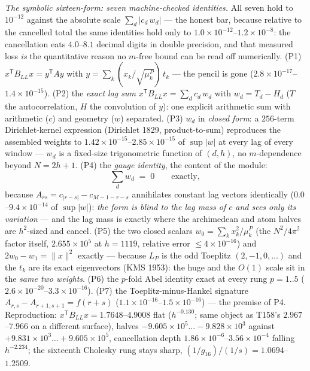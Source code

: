\documentclass[11pt,a4paper]{article}
\begin{document}
\emph{The symbolic sixteen-form: seven machine-checked identities.} All seven hold
to $10^{-12}$ against the absolute scale $\sum_d|c_d\,w_d|$ --- the honest bar,
because relative to the cancelled total the same identities hold only to
$1.0\times10^{-12}$--$1.2\times10^{-8}$: the cancellation eats $4.0$--$8.1$ decimal
digits in double precision, and that measured loss \emph{is} the quantitative
reason no $m$-free bound can be read off numerically. (P1) $x^{\mathsf
T}B_{LL}x=y^{\mathsf T}Ay$ with $y=\sum_k(x_k/\sqrt{\mu^P_k})\,t_k$ --- the pencil
is gone ($2.8\times10^{-17}$--$1.4\times10^{-15}$). (P2) the \emph{exact lag sum}
$x^{\mathsf T}B_{LL}x=\sum_d c_d\,w_d$ with $w_d=T_d-H_d$ ($T$ the autocorrelation,
$H$ the convolution of $y$): one explicit arithmetic sum with arithmetic ($c$) and
geometry ($w$) separated. (P3) $w_d$ in \emph{closed form}: a $256$-term
Dirichlet-kernel expression (Dirichlet 1829, product-to-sum) reproduces the
assembled weights to $1.42\times10^{-15}$--$2.85\times10^{-15}$ of $\sup|w|$ at
every lag of every window --- $w_d$ is a fixed-size trigonometric function of
$(d,h)$, no $m$-dependence beyond $N=2h+1$. (P4) the \emph{gauge identity},
the content of the module:
\[
\sum_d w_d \;=\; 0 \qquad\text{exactly},
\]
because $A_{rs}=c_{|r-s|}-c_{M-1-r-s}$ annihilates constant lag vectors
identically ($0.0$--$9.4\times10^{-14}$ of $\sup|w|$): \emph{the form is blind to
the lag mass of $c$ and sees only its variation} --- and the lag mass is exactly
where the archimedean and atom halves are $h^2$-sized and cancel. (P5) the two
closed scalars $w_0=\sum_k x_k^2/\mu^P_k$ (the $N^2/4\pi^2$ factor itself,
$2.655\times10^{5}$ at $h=1119$, relative error $\le4\times10^{-16}$) and
$2w_0-w_1=\|x\|^2$ exactly --- because $L_P$ is the odd Toeplitz
$(2,-1,0,\ldots)$ and the $t_k$ are its exact eigenvectors (KMS 1953): the huge
and the $O(1)$ scale sit in the \emph{same two weights}. (P6) the $p$-fold Abel
identity exact at every rung $p=1..5$ ($2.6\times10^{-20}$--$3.3\times10^{-16}$).
(P7) the Toeplitz-minus-Hankel signature $A_{r,s}-A_{r+1,s+1}=f(r+s)$
($1.1\times10^{-16}$--$1.5\times10^{-16}$) --- the premise of P4. Reproduction:
$x^{\mathsf T}B_{LL}x=1.7648$--$4.9008$ flat ($h^{-0.130}$; same object as T158's
$2.967$--$7.966$ on a different surface), halves $-9.605\times10^{5}\ldots
-9.828\times10^{3}$ against $+9.831\times10^{3}\ldots+9.605\times10^{5}$,
cancellation depth $1.86\times10^{-6}$--$3.56\times10^{-4}$ falling $h^{-2.234}$;
the sixteenth Cholesky rung stays sharp, $(1/g_{16})/(1/s)=1.0694$--$1.2509$.
\end{document}
